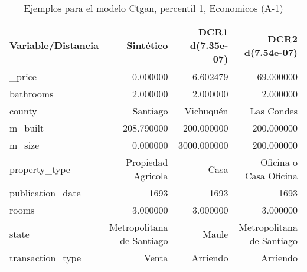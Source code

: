 \begin{table}[H]
\centering
\fontsize{10}{14}\selectfont
\caption{Ejemplos para el modelo Ctgan, percentil 1, Economicos (A-1)}
\label{table-example-economicos-a-1-ctgan-1p}
\begin{tabular}{|l|r|r|r|}
\hline
\rowcolor[gray]{0.8}
Variable/Distancia & Sintético & DCR1 d(7.35e-07) & DCR2 d(7.54e-07) \\
\hline \_price & \cellcolor[rgb]{0.9, 0.54, 0.52} 0.000000 & 6.602479 & 69.000000 \\
\hline bathrooms & \cellcolor[rgb]{0.9, 0.54, 0.52} 2.000000 & \cellcolor[rgb]{0.9, 0.54, 0.52} 2.000000 & \cellcolor[rgb]{0.9, 0.54, 0.52} 2.000000 \\
\hline county & \cellcolor[rgb]{0.9, 0.54, 0.52} Santiago & Vichuquén & Las Condes \\
\hline m\_built & \cellcolor[rgb]{0.9, 0.54, 0.52} 208.790000 & 200.000000 & 200.000000 \\
\hline m\_size & \cellcolor[rgb]{0.9, 0.54, 0.52} 0.000000 & 3000.000000 & 200.000000 \\
\hline property\_type & \cellcolor[rgb]{0.9, 0.54, 0.52} Propiedad Agricola & Casa & Oficina o Casa Oficina \\
\hline publication\_date & \cellcolor[rgb]{0.9, 0.54, 0.52} 1693 & \cellcolor[rgb]{0.9, 0.54, 0.52} 1693 & \cellcolor[rgb]{0.9, 0.54, 0.52} 1693 \\
\hline rooms & \cellcolor[rgb]{0.9, 0.54, 0.52} 3.000000 & \cellcolor[rgb]{0.9, 0.54, 0.52} 3.000000 & \cellcolor[rgb]{0.9, 0.54, 0.52} 3.000000 \\
\hline state & \cellcolor[rgb]{0.9, 0.54, 0.52} Metropolitana de Santiago & Maule & \cellcolor[rgb]{0.9, 0.54, 0.52} Metropolitana de Santiago \\
\hline transaction\_type & \cellcolor[rgb]{0.9, 0.54, 0.52} Venta & Arriendo & Arriendo \\
\hline
\end{tabular}
\end{table}
